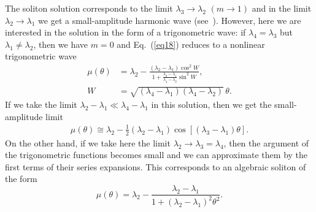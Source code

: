 \documentclass[pre,aps,superscriptaddress,twocolumn,floatfix]{revtex4-1}
\newcommand{\la}{\lambda}
\begin{document}
The soliton solution corresponds to the limit $\la_3\to\la_2$
$(m\to1)$ and in the limit
$\la_2\to\la_1$ we get a small-amplitude harmonic wave
(see~\cite{CongyIvanovKamchatnovPavloff-17}).
However, here we are interested in the solution in the form of a trigonometric wave:
if $\la_4=\la_3$ but $\la_1\neq\la_2$, then we have $m=0$ and
Eq.~(\ref{eq18}) reduces to a nonlinear trigonometric wave
\begin{equation}\label{eq21}
\begin{split}
\mu(\theta)&=\la_2-\frac{(\la_2-\la_1)\cos^2W}{1+\frac{\la_2-\la_1}{\la_4-\la_2}\sin^2W},\\
W&=\sqrt{(\la_4-\la_1)(\la_4-\la_2)}\,\theta.
\end{split}
\end{equation}
If we take the limit $\la_2-\la_1\ll \la_4-\la_1$ in this solution, then we
get the small-amplitude limit
\begin{equation}\label{equ25}
\begin{split}
\mu(\theta)\cong \la_2-\frac12(\la_2-\la_1)\cos[(\la_3-\la_1)\theta].
\end{split}
\end{equation}
On the other hand, if we take here the limit $\la_2\to \la_3=\la_4$, then the
argument of the trigonometric functions becomes small and we can
approximate them by the first terms of their series expansions. This
corresponds to an algebraic soliton of the form
\begin{equation}\label{eq21a}
\mu(\theta)=\la_2-\frac{\la_2-\la_1}{1+(\la_2-\la_1)^2\theta^2}.
\end{equation}
\end{document}
